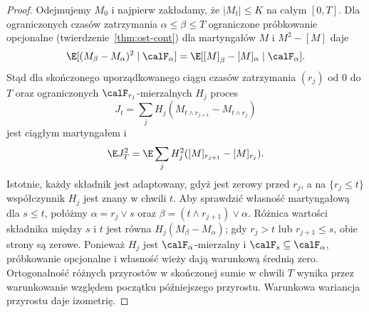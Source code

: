 \begin{proof}
Odejmujemy $M_0$ i najpierw zakładamy, że
$|M_t|\le K$ na całym $[0,T]$. Dla ograniczonych
czasów zatrzymania $\alpha\le\beta\le T$
ograniczone próbkowanie opcjonalne
(twierdzenie~\ref{thm:ost-cont}) dla martyngałów
$M$ i $M^2-[M]$ daje
\[
\E[(M_\beta-M_\alpha)^2\mid\calF_\alpha]
=\E[[M]_\beta-[M]_\alpha\mid\calF_\alpha].
\]
Stąd dla skończonego uporządkowanego ciągu czasów
zatrzymania $(r_j)$ od $0$ do $T$ oraz ograniczonych
$\calF_{r_j}$-mierzalnych $H_j$ proces
\[
J_t=\sum_j H_j(M_{t\wedge r_{j+1}}-M_{t\wedge r_j})
\]
jest ciągłym martyngałem i
\[
\E J_T^2=\E\sum_j H_j^2([M]_{r_{j+1}}-[M]_{r_j}).
\]
Istotnie, każdy składnik jest adaptowany, gdyż
jest zerowy przed $r_j$, a na $\{r_j\le t\}$
współczynnik $H_j$ jest znany w chwili $t$.
Aby sprawdzić własność martyngałową dla $s\le t$,
połóżmy $\alpha=r_j\vee s$ oraz
$\beta=(t\wedge r_{j+1})\vee\alpha$.
Różnica wartości składnika między $s$ i $t$
jest równa $H_j(M_\beta-M_\alpha)$; gdy
$r_j>t$ lub $r_{j+1}\le s$, obie strony są zerowe.
Ponieważ $H_j$ jest $\calF_\alpha$-mierzalny
i $\calF_s\subseteq\calF_\alpha$, próbkowanie
opcjonalne i własność wieży dają warunkową
średnią zero. Ortogonalność różnych przyrostów
w skończonej sumie w chwili $T$ wynika przez
warunkowanie względem początku późniejszego przyrostu.
Warunkowa wariancja przyrostu daje izometrię.


\end{proof}

